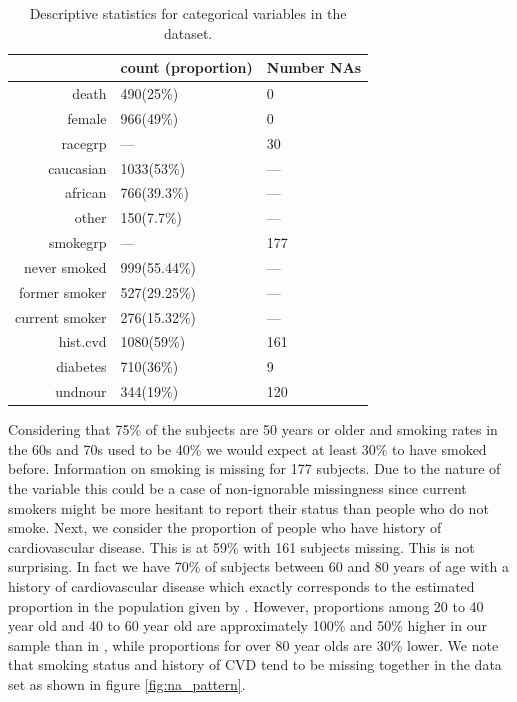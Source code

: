 \documentclass[paper=a4, fontsize=11pt]{scrartcl} %
\numberwithin{equation}{section} %
\numberwithin{figure}{section} %
\numberwithin{table}{section} %
\begin{document}
\begin{table}[H]
\centering
\begin{tabular}{rll}
  \hline
 & count (proportion) & Number NAs \\ 
  \hline
death & 490(25\%) & 0 \\ 
  female & 966(49\%) & 0 \\ 
  racegrp & --- & 30 \\ 
  caucasian & 1033(53\%) & --- \\ 
  african & 766(39.3\%) & --- \\ 
  other & 150(7.7\%) & --- \\ 
  smokegrp & --- & 177 \\ 
  never smoked & 999(55.44\%) & --- \\ 
  former smoker & 527(29.25\%) & --- \\ 
  current smoker & 276(15.32\%) & --- \\ 
  hist.cvd & 1080(59\%) & 161 \\ 
  diabetes & 710(36\%) & 9 \\ 
  undnour & 344(19\%) & 120 \\ 
   \hline
\end{tabular}
\caption{Descriptive statistics for categorical variables in the dataset.}
\label{tab:cat}
\end{table}

Considering that 75\% of the subjects are 50 years or older and smoking rates in the 60s and 70s used to be 40\% \cite{gallup} we would expect at least 30\% to have smoked before. Information on smoking is missing for 177 subjects. Due to the nature of the variable this could be a case of non-ignorable missingness since current smokers might be more hesitant to report their status than people who do not smoke.
Next, we consider the proportion of people who have history of cardiovascular disease. This is at 59\% with 161 subjects missing. This is not surprising. In fact we have 70\% of subjects between 60 and 80 years of age with a history of cardiovascular disease which exactly corresponds to the estimated proportion in the population given by \cite{cvd}. However, proportions among 20 to 40 year old and 40 to 60 year old are approximately 100\% and 50\% higher in our sample than in \cite{cvd}, while proportions for over 80 year olds are 30\% lower.
We note that smoking status and history of CVD tend to be missing together in the data set as shown in figure \ref{fig:na_pattern}.\\ %
\end{document}
